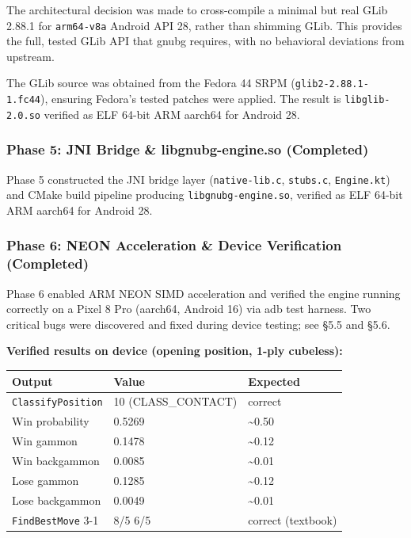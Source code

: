 \documentclass[11pt,a4paper]{article}
\begin{document}
The architectural decision was made to cross-compile a minimal but real
GLib 2.88.1 for \texttt{arm64-v8a} Android API 28, rather than shimming
GLib. This provides the full, tested GLib API that gnubg requires, with
no behavioral deviations from upstream.

The GLib source was obtained from the Fedora 44 SRPM
(\texttt{glib2-2.88.1-1.fc44}), ensuring Fedora's tested patches were
applied. The result is \texttt{libglib-2.0.so} verified as ELF 64-bit
ARM aarch64 for Android 28.

\subsubsection{Phase 5: JNI Bridge \& libgnubg-engine.so
(Completed)}\label{phase-5-jni-bridge-libgnubg-engine.so-completed}

Phase 5 constructed the JNI bridge layer (\texttt{native-lib.c},
\texttt{stubs.c}, \texttt{Engine.kt}) and CMake build pipeline producing
\texttt{libgnubg-engine.so}, verified as ELF 64-bit ARM aarch64 for
Android 28.

\subsubsection{Phase 6: NEON Acceleration \& Device Verification
(Completed)}\label{phase-6-neon-acceleration-device-verification-completed}

Phase 6 enabled ARM NEON SIMD acceleration and verified the engine
running correctly on a Pixel 8 Pro (aarch64, Android 16) via adb test
harness. Two critical bugs were discovered and fixed during device
testing; see §5.5 and §5.6.

\textbf{Verified results on device (opening position, 1-ply cubeless):}

\begin{longtable}[]{@{}lll@{}}
\toprule\noalign{}
Output & Value & Expected \\
\midrule\noalign{}
\endhead
\bottomrule\noalign{}
\endlastfoot
\texttt{ClassifyPosition} & 10 (CLASS\_CONTACT) & correct \\
Win probability & 0.5269 & \textasciitilde0.50 \\
Win gammon & 0.1478 & \textasciitilde0.12 \\
Win backgammon & 0.0085 & \textasciitilde0.01 \\
Lose gammon & 0.1285 & \textasciitilde0.12 \\
Lose backgammon & 0.0049 & \textasciitilde0.01 \\
\texttt{FindBestMove} 3-1 & 8/5 6/5 & correct (textbook) \\
\end{longtable}
\end{document}
